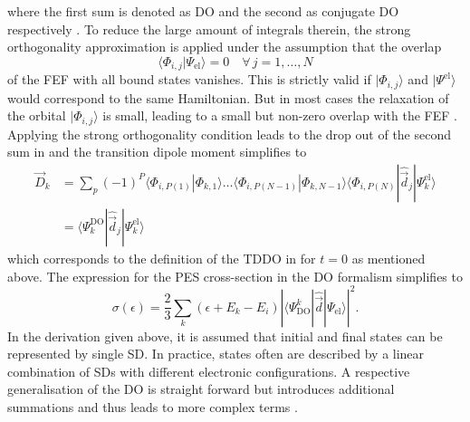 where the first sum is denoted as DO and the second as conjugate DO respectively \cite{saPonzi}.
To reduce the large amount of integrals therein, the strong orthogonality approximation is applied under the assumption that the overlap 
\begin{equation}
 \langle \Phi_{i,j}  |\Psi_\text{el}\rangle=0 \quad \forall\, j=1,\hdots, N
\end{equation}
of the FEF with all bound states vanishes.
This is strictly valid if $|\Phi_{i,j}\rangle$ and $|\Psi^\text{el}\rangle$ would correspond to the same Hamiltonian.
But in most cases the relaxation of the orbital $|\Phi_{i,j}\rangle$ is small, leading to a small but non-zero overlap with the FEF \cite{saPonzi,GrellKuehn}.
Applying the strong orthogonality condition leads to the drop out of the second sum in  and the transition dipole moment simplifies to
\begin{align} \label{eq:sigma_do}
\vec{D}_k&= \sum_p (-1)^P \langle \Phi_{i,P(1)}  |\Phi_{k,1} \rangle
            \hdots  \langle \Phi_{i,P(N-1)}|\Phi_{k,N-1} \rangle
                   \langle \Phi_{i,P(N)} |\hat{\vec{d}}_j |\Psi_k^\text{el}\rangle \nonumber \\
    &= \langle \Psi_k^\text{DO}| \hat{\vec{d}}_j| \Psi_k^\text{el}\rangle
\end{align}
which corresponds to the definition of the TDDO in  for $t=0$ as mentioned above.
The expression for the PES cross-section in the DO formalism simplifies to
\begin{equation} \label{eq:DO_pes}
\sigma(\epsilon) =\frac 23 \sum_k (\epsilon +E_k-E_i)  
             \left|  \langle \Psi^k_\text{DO} | \hat{\vec{d}} | \Psi_\text{el}\rangle  \right|^2 .
\end{equation}
In the derivation given above, it is assumed that initial and final states can be represented by single SD.
In practice, states often are described by a linear combination of SDs with different electronic configurations.
A respective generalisation of the DO is straight forward but introduces additional summations and thus leads to more complex terms \cite{GrellKuehn}.

